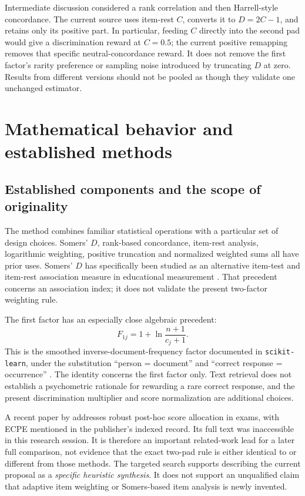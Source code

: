 \documentclass[11pt,a4paper,oneside,headings=normal,parskip=half]{scrreprt}
\newcommand{\code}[1]{\nolinkurl{#1}}
\begin{document}
Intermediate discussion considered a rank correlation and then Harrell-style concordance. The current source uses item-rest $C$, converts it to $D=2C-1$, and retains only its positive part. In particular, feeding $C$ directly into the second pad would give a discrimination reward at $C=0.5$; the current positive remapping removes that specific neutral-concordance reward. It does not remove the first factor's rarity preference or sampling noise introduced by truncating $D$ at zero. Results from different versions should not be pooled as though they validate one unchanged estimator.

\chapter{Mathematical behavior and established methods}
\section{Established components and the scope of originality}
The method combines familiar statistical operations with a particular set of design choices. Somers' $D$, rank-based concordance, item-rest analysis, logarithmic weighting, positive truncation and normalized weighted sums all have prior uses. Somers' $D$ has specifically been studied as an alternative item-test and item-rest association measure in educational measurement \citep{metsamuuronen}. That precedent concerns an association index; it does not validate the present two-factor weighting rule.

The first factor has an especially close algebraic precedent:
\begin{equation}
 F_{1j}=1+\ln\frac{n+1}{c_j+1}.
\end{equation}
This is the smoothed inverse-document-frequency factor documented in \code{scikit-learn}, under the substitution ``person = document'' and ``correct response = occurrence'' \citep{tfidf}. The identity concerns the first factor only. Text retrieval does not establish a psychometric rationale for rewarding a rare correct response, and the present discrimination multiplier and score normalization are additional choices.

A recent paper by \citet{kita} addresses robust post-hoc score allocation in exams, with ECPE mentioned in the publisher's indexed record. Its full text was inaccessible in this research session. It is therefore an important related-work lead for a later full comparison, not evidence that the exact two-pad rule is either identical to or different from those methods. The targeted search supports describing the current proposal as a \emph{specific heuristic synthesis}. It does not support an unqualified claim that adaptive item weighting or Somers-based item analysis is newly invented.
\end{document}
